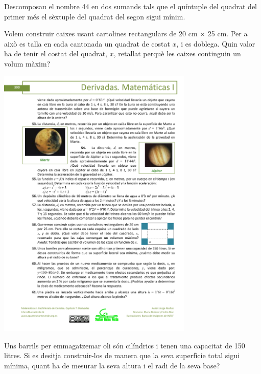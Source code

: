 \begin{mylist}
	
	\exer[-1] Descomposau el nombre 44 en dos sumands tals que el quíntuple del quadrat del primer més el sèxtuple del quadrat del segon sigui mínim.
	
	\begin{minipage}{0.7\textwidth}			
		\exer[-1] Volem construir caixes usant cartolines rectangulars de 20 cm $\times$ 25 cm. Per a això es talla en cada cantonada un quadrat de costat $x$, i es doblega. Quin valor ha de tenir el costat del quadrat, $x$, retallat perquè les caixes continguin un volum màxim? 
	\end{minipage}
	\begin{minipage}{0.3\textwidth}
		\includegraphics*[width=0.7\textwidth]{img-07/chap-deriv-caixa.pdf}	
	\end{minipage}
	
	
	\exer Uns barrils per emmagatzemar oli són cilíndrics i tenen una capacitat de 150 litres. Si es desitja construir-los de manera que la seva superfície total sigui mínima, quant ha de mesurar la seva altura i el radi de la seva base?
	
	

\end{mylist}
